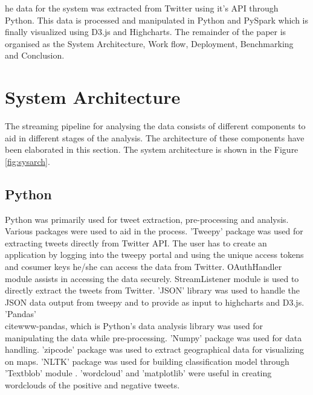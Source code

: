 \documentclass[9pt,twocolumn,twoside]{../../styles/osajnl}
\begin{document}
he data for the system was extracted from Twitter using it's API through Python. This data is processed and manipulated in Python and PySpark which is finally visualized using D3.js and Highcharts. The remainder of the paper is organised as the System Architecture, Work flow, Deployment, Benchmarking and Conclusion. \section{System Architecture}
The streaming pipeline for analysing the data consists of different components to aid in different stages of the analysis. The architecture of these components have been elaborated in this section. The system architecture is shown in the Figure \ref{fig:sysarch}.
\subsection{Python}
Python was primarily used for tweet extraction, pre-processing and analysis. Various packages were used to aid in the process. 'Tweepy' package\cite{www-tweepy} was used for extracting tweets directly from Twitter API. The user has to create an application by logging into the tweepy portal and using the unique access tokens and cosumer keys he/she can access the data from Twitter. OAuthHandler module assists in accessing the data securely. StreamListener module is used to directly extract the tweets from Twitter. 'JSON' library \cite{www-json} was used to handle the JSON data output from tweepy and to provide as input to highcharts and D3.js. 'Pandas' \\cite{www-pandas}, which is Python's data analysis library was used for manipulating the data while pre-processing. 'Numpy' \cite{www-numpy} package was used for data handling. 'zipcode' \cite{www-zipcode} package was used to extract geographical data for visualizing on maps. 'NLTK' \cite{www-nltk} package was used for building classification model through 'Textblob' module \cite{www-textblob}. 'wordcloud' \cite{www-wordcloud} and 'matplotlib' \cite{www-matplotlib} were useful in creating wordclouds of the positive and negative tweets.   
\end{document}
